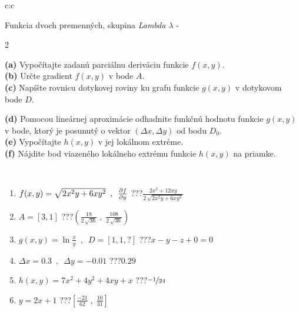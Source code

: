 \documentclass[10pt]{report}
\begin{document}
\begin{tabular}{c:c}
\begin{minipage}[c][104.5mm][t]{0.5\linewidth}
\begin{center}
\vspace{7mm}
{\huge \LARGE Funkcia dvoch premenných, skupina \textit{Lambda $\lambda$} -}\\[5mm]
\begin{minipage}{0.95\linewidth}
\begin{center}
{\small \begin{multicols}{2} \raggedright
\textbf{(a)} Vypočítajte zadanú parciálnu deriváciu funkcie \(f(x,y)\). \\[1mm]
\textbf{(b)} Určte gradient \(f(x,y)\) v bode \(A\). \\[1mm]
\textbf{(c)} Napíšte rovnicu dotykovej roviny ku grafu funkcie \(g(x,y)\) v dotykovom bode \(D\). \par \columnbreak
\textbf{(d)} Pomocou lineárnej aproximácie odhadnite funkčnú hodnotu funkcie \(g(x,y)\) v bode, ktorý je posunutý o vektor \((\Delta x, \Delta y)\) od bodu \(D_0\). \\[1mm]
\textbf{(e)} Vypočítajte \(h(x,y)\) v jej lokálnom extréme. \\[1mm]
\textbf{(f)} Nájdite bod viazeného lokálneho extrému funkcie \(h(x,y)\) na priamke. \\[1mm]
\end{multicols}
}
\end{center}
\end{minipage}
\\[4mm]
\begin{minipage}{0.79\linewidth}
\begin{center}
\begin{varwidth}{\linewidth}
\begin{enumerate}
\normalsizerr
\item $f(x,y) = \sqrt{2x^2y + 6xy^2}\enspace , \enspace \pdv{f}{y}$\quad \dotfill\; ???\;\dotfill \quad $\frac{2x^2+12xy}{2\,\sqrt{2x^2y+6xy^2}}$
\item $A = [3, 1]$\quad \dotfill\; ???\;\dotfill \quad $\left( \frac{18}{2\,\sqrt{36}} \;,\; \frac{108}{2\,\sqrt{36}} \right)$
\item $g(x,y) = \ln\frac{x}{y} \enspace , \enspace D=[1,1,?]$\quad \dotfill\; ???\;\dotfill \quad $x - y - z + 0 = 0$
\item $\Delta x = {0.3} \enspace,\enspace \Delta y = {-0.01}$\quad \dotfill\; ???\;\dotfill \quad $0.29$
\item $h(x,y) = 7x^2+4y^2+4xy+x$\quad \dotfill\; ???\;\dotfill \quad $\nicefrac{-1}{24}$
\item $y = 2x+1$\quad \dotfill\; ???\;\dotfill \quad $\left[\frac{-21}{62}\;,\;\frac{10}{31}\right]$

\end{enumerate}
\end{varwidth}
\end{center}
\end{minipage}
\end{center}
\end{minipage}
\end{tabular}
\end{document}
